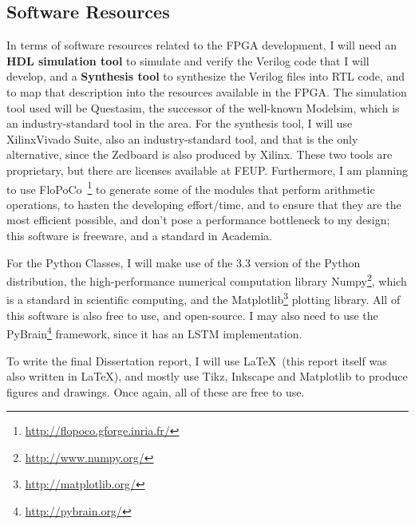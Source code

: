 \subsection{Software Resources}
In terms of software resources related to the FPGA development, I will need an \textbf{HDL simulation tool} to simulate and verify the Verilog code that I will develop, and a \textbf{Synthesis tool} to synthesize the Verilog files into RTL code, and to map that description into the resources available in the FPGA. The simulation tool used will be Questasim\texttrademark, the successor of the well-known Modelsim\texttrademark, which is an industry-standard tool in the area. For the synthesis tool, I will use Xilinx\textregistered Vivado Suite, also an industry-standard tool, and that is the only alternative, since the Zedboard is also produced by Xilinx\textregistered. These two tools are proprietary, but there are licenses available at FEUP. Furthermore, I am planning to use FloPoCo~\footnote{\href{http://flopoco.gforge.inria.fr/}{http://flopoco.gforge.inria.fr/}} to generate some of the modules that perform arithmetic operations, to hasten the developing effort/time, and to ensure that they are the most efficient possible, and don't pose a performance bottleneck to my design; this software is freeware, and a standard in Academia.

For the Python Classes, I will make use of the 3.3 version of the Python distribution, the high-performance numerical computation library Numpy\footnote{\href{http://www.numpy.org/}{http://www.numpy.org/}}, which is a standard in scientific computing, and the Matplotlib\footnote{\href{http://matplotlib.org/}{http://matplotlib.org/}} plotting library. All of this software is also free to use, and open-source. I may also need to use the PyBrain\footnote{\href{http://pybrain.org/}{http://pybrain.org/}} framework, since it has an LSTM implementation. 

To write the final Dissertation report, I will use \LaTeX~(this report itself was also written in \LaTeX), and mostly use Tikz, Inkscape and Matplotlib to produce figures and drawings. Once again, all of these are free to use.
